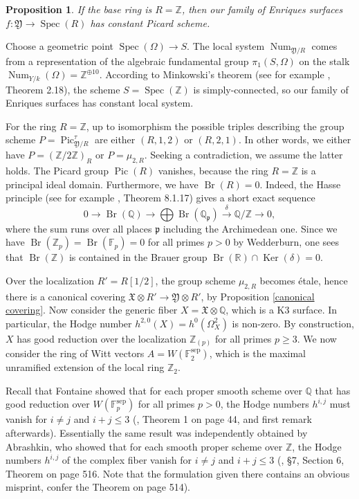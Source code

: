 \documentclass[oneside, 12pt]{amsart}
\newcommand\mylabel[1]{\label{#1}\marginpar{\vspace{-1ex}\medskip\medskip\footnotesize \tt #1}}
\renewcommand\mylabel[1]{\label{#1}}
\newtheorem{proposition}[theorem]{Proposition}
\theoremstyle{definition}
\theoremstyle{remark}
\newcommand{\ZZ}{\mathbb{Z}}
\newcommand{\QQ}{\mathbb{Q}}
\newcommand{\RR}{\mathbb{R}}
\newcommand{\FF}{\mathbb{F}}
\newcommand{\foX}{\mathfrak{X}}
\newcommand{\foY}{\mathfrak{Y}}
\newcommand{\Br}{\operatorname{Br}}
\newcommand{\Kernel}{\operatorname{Ker}}
\newcommand{\lra}{\longrightarrow}
\newcommand{\Num}{\operatorname{Num}}
\newcommand{\primid}{\mathfrak{p}}
\newcommand{\Pic}{\operatorname{Pic}}
\newcommand{\ra}{\rightarrow}
\newcommand{\sep}{{\operatorname{sep}}}
\newcommand{\Spec}{\operatorname{Spec}}
\begin{document}
\begin{proposition}
\mylabel{constant picard scheme}
If the base ring is $R=\ZZ$, then our family of Enriques surfaces $f:\foY\ra\Spec(R)$ has constant Picard scheme.
\end{proposition}

\proof
Choose  a geometric point $\Spec(\Omega)\ra S$.
The local system $\Num_{\foY/R}$ comes from a representation of the algebraic fundamental group
$\pi_1(S,\Omega)$ on the stalk $\Num_{Y/k}(\Omega)=\ZZ^{\oplus 10}$. According to Minkowski's theorem  
(see for example \cite{Neukirch 1999}, Theorem 2.18), the scheme $S=\Spec(\ZZ)$
is simply-connected, so our family of Enriques surfaces has constant local system.

For the ring $R=\ZZ$, up to isomorphism the possible triples describing the group scheme $P=\Pic^\tau_{\foY/R}$
are either $(R,1,2)$ or $(R,2,1)$. In other words, we either have $P=(\ZZ/2\ZZ)_R$ or $P=\mu_{2,R}$.
Seeking a contradiction, we assume the latter holds.
The Picard group $\Pic(R)$ vanishes, because the ring  $R=\ZZ$ is a principal ideal domain.
Furthermore, we have $\Br(R)=0$. Indeed, the Hasse principle (see for example \cite{Neukirch; Schmidt; Wingberg 2008}, Theorem 8.1.17)
gives a short exact sequence
$$
0\lra\Br(\QQ)\lra \bigoplus\Br(\QQ_\primid)\stackrel{\delta}{\lra} \QQ/\ZZ\lra 0,
$$
where the sum runs over all places $\primid$ including the Archimedean one. Since we have $\Br(\ZZ_p)=\Br(\FF_p)=0$ for all primes $p>0$ by Wedderburn,
one sees that $\Br(\ZZ)$ is contained in the Brauer group $\Br(\RR)\cap\Kernel(\delta)=0$.
 
Over the localization $R'=R[1/2]$, the group scheme $\mu_{2,R}$ becomes \'etale, hence there is a canonical covering
$\foX\otimes R'\ra\foY\otimes R'$, by Proposition \ref{canonical covering}.
Now consider the generic fiber $X=\foX\otimes\QQ$, which is a K3 surface. In particular, the Hodge number
$h^{2,0}(X)=h^0(\Omega_X^2)$ is non-zero.
By construction, $X$ has good reduction over the localization $\ZZ_{(p)}$ for all primes $p\geq 3$.
We now consider the ring of Witt vectors 
$A=W(\FF_2^\sep)$, which is the maximal unramified extension of the local ring $\ZZ_2$.

Recall that Fontaine showed that for each proper smooth scheme over $\QQ$ that has good reduction over
$W(\FF_p^\sep)$ for all primes $p>0$, the Hodge numbers $h^{i,j}$ must vanish for $i\neq j$ and $i+j\leq 3$
(\cite{Fontaine 1993}, Theorem 1 on page 44, and first remark afterwards).
Essentially the same  result was independently obtained by Abrashkin, who showed that for each smooth proper
scheme over $\ZZ$, the Hodge numbers $h^{i,j}$ of  the complex fiber vanish for $i\neq j$ and $i+j\leq 3$
(\cite{Abrashkin 1990}, \S7,  Section 6, Theorem on page 516. Note that the formulation given there contains an obvious misprint,
confer the Theorem on page 514).
\end{document}

